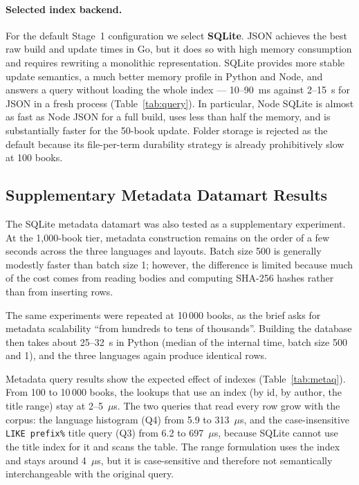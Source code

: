 \documentclass[12pt,a4paper]{article}
\begin{document}
	\paragraph{Selected index backend.}
	For the default Stage~1 configuration we select \textbf{SQLite}. JSON achieves the best
	raw build and update times in Go, but it does so with high memory consumption and requires
	rewriting a monolithic representation. SQLite provides more stable update semantics,
	a much better memory profile in Python and Node, and answers a query without loading the
	whole index --- 10--90~ms against 2--15~s for JSON in a fresh process
	(Table~\ref{tab:query}). In particular, Node SQLite is almost as
	fast as Node JSON for a full build, uses less than half the memory, and is substantially
	faster for the 50-book update. Folder storage is rejected as the default because its
	file-per-term durability strategy is already prohibitively slow at 100 books.
	
	\subsection{Supplementary Metadata Datamart Results}
	
	The SQLite metadata datamart was also tested as a supplementary experiment. At the
	1,000-book tier, metadata construction remains on the order of a few seconds across the
	three languages and layouts. Batch size 500 is generally modestly faster than batch size
	1; however, the difference is limited because much of the cost comes from reading bodies
	and computing SHA-256 hashes rather than from inserting rows.
	
	The same experiments were repeated at 10\,000 books, as the brief asks for metadata
	scalability ``from hundreds to tens of thousands''. Building the database then takes
	about 25--32~s in Python (median of the internal time, batch size 500 and 1), and the
	three languages again produce identical rows.

	Metadata query results show the expected effect of indexes (Table~\ref{tab:metaq}).
	From 100 to 10\,000 books, the lookups that use an index (by id, by author, the title
	range) stay at 2--5~$\mu$s. The two queries that read every row grow with the corpus:
	the language histogram (Q4) from 5.9 to 313~$\mu$s, and the case-insensitive
	\texttt{LIKE prefix\%} title query (Q3) from 6.2 to 697~$\mu$s, because SQLite cannot use
	the title index for it and scans the table. The range formulation uses the index and stays
	around 4~$\mu$s, but it is case-sensitive and therefore not semantically interchangeable
	with the original query.
\end{document}
